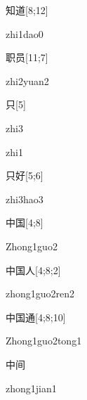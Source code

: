 \begin{verbete}{知道}[8;12]
\begin{pronuncia}{zhi1dao0}
\end{pronuncia}
\end{verbete}

\begin{verbete}{职员}[11;7]
\begin{pronuncia}{zhi2yuan2}
\end{pronuncia}
\end{verbete}

\begin{verbete}[zhi3]{只}[5]
\begin{pronuncia}{zhi3}
\end{pronuncia}
\begin{pronuncia}{zhi1}
\end{pronuncia}
\end{verbete}

\begin{verbete}{只好}[5;6]
\begin{pronuncia}{zhi3hao3}
\end{pronuncia}
\end{verbete}

\begin{verbete}{中国}[4;8]
\begin{pronuncia}{Zhong1guo2}
\end{pronuncia}
\end{verbete}

\begin{verbete}{中国人}[4;8;2]
\begin{pronuncia}{zhong1guo2ren2}
\end{pronuncia}
\end{verbete}

\begin{verbete}{中国通}[4;8;10]
\begin{pronuncia}[\\]{Zhong1guo2tong1}
\end{pronuncia}
\end{verbete}

\begin{verbete}{中间}
\begin{pronuncia}{zhong1jian1}
\end{pronuncia}
\end{verbete}

